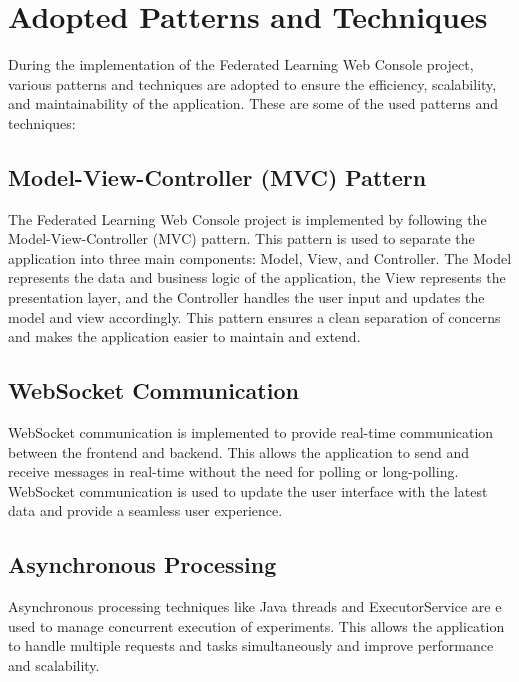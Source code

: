 \section{Adopted Patterns and Techniques}


During the implementation of the Federated Learning Web Console project, various patterns and techniques are adopted to ensure the efficiency, scalability, and maintainability of the application. These are some of the used patterns and techniques:\\

\subsection{Model-View-Controller (MVC) Pattern}
The Federated Learning Web Console project is implemented by following the Model-View-Controller (MVC) pattern. This pattern is used to separate the application into three main components: Model, View, and Controller. The Model represents the data and business logic
of the application, the View represents the presentation layer, and the Controller handles the user input and updates the model and view accordingly. This pattern ensures a clean separation of concerns and makes the application easier to maintain and extend.\\

\subsection{WebSocket Communication}
WebSocket communication is implemented to provide real-time communication between the frontend and backend. This allows the application to send and receive messages in real-time without the need for polling or long-polling. WebSocket communication is used to update the user interface with the latest data and provide a seamless user experience.\\

\subsection{Asynchronous Processing}
Asynchronous processing techniques like Java threads and ExecutorService are e used to manage concurrent execution of experiments. This allows the application to handle multiple requests and tasks simultaneously and improve performance and scalability.\\


